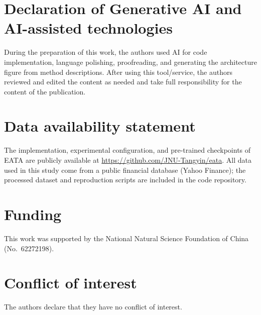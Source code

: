 \documentclass{elektr}
\begin{document}
\section*{Declaration of Generative AI and AI-assisted technologies}
During the preparation of this work, the authors used AI for code implementation, language polishing, proofreading, and generating the architecture figure from method descriptions. After using this tool/service, the authors reviewed and edited the content as needed and take full responsibility for the content of the publication.

\section*{Data availability statement}
The implementation, experimental configuration, and pre-trained checkpoints of EATA are publicly available at \url{https://github.com/JNU-Tangyin/eata}. All data used in this study come from a public financial database (Yahoo Finance); the processed dataset and reproduction scripts are included in the code repository.

\section*{Funding}
This work was supported by the National Natural Science Foundation of China (No.~62272198).

\section*{Conflict of interest}
The authors declare that they have no conflict of interest.





\end{document}
